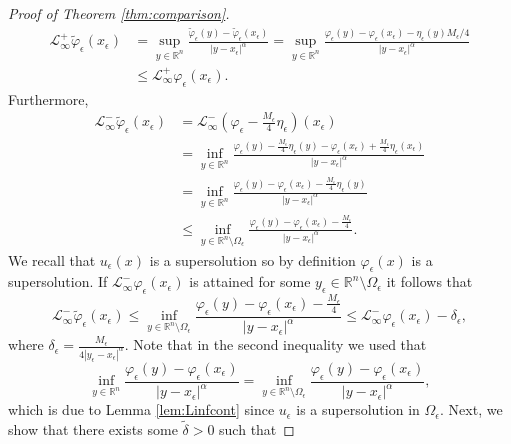 \documentclass[11pt]{article}
\providecommand{\Lpos}{\mathcal{L}_{\infty}^+}
\providecommand{\Lneg}{\mathcal{L}_{\infty}^-}
\providecommand{\Rn}{\mathbb{R}^n}
\numberwithin{equation}{section}
\theoremstyle{definition}
\begin{document}
\begin{proof}[Proof of Theorem \ref{thm:comparison}]
\begin{align}
    \Lpos \tilde{\varphi}_{\epsilon}(x_{\epsilon}) &= \sup_{y \in \Rn} \frac{\tilde{\varphi}_{\epsilon}(y)-\tilde{\varphi}_{\epsilon}(x_{\epsilon})}{|y-x_{\epsilon}|^{\alpha}} = \sup_{y \in \Rn} \frac{\varphi_{\epsilon}(y)-\varphi_{\epsilon}(x_{\epsilon})-\eta_{\epsilon} (y)M_{\epsilon}/4}{|y-x_{\epsilon}|^{\alpha}} \nonumber \\
    & \leq \Lpos \varphi_{\epsilon}(x_{\epsilon}). \label{eq:Lplus}
\end{align}
 Furthermore, 
\begin{align}
    \Lneg \tilde{\varphi}_{\epsilon}(x_{\epsilon}) &= \Lneg \left(\varphi_{\epsilon}-\frac{M_{\epsilon}}{4} \eta_{\epsilon} \right)(x_{\epsilon}) \nonumber \\  
    &= \inf_{y \in \Rn} \frac{\varphi_{\epsilon}(y)-\frac{M_{\epsilon}}{4}\eta_{\epsilon} (y)-\varphi_{\epsilon}(x_{\epsilon})+\frac{M_{\epsilon}}{4}\eta_{\epsilon} (x_{\epsilon})}{|y-x_{\epsilon}|^{\alpha}}\nonumber   \\
    &=\inf_{y \in \Rn} \frac{\varphi_{\epsilon}(y)-\varphi_{\epsilon}(x_{\epsilon})-\frac{M_{\epsilon}}{4}\eta_{\epsilon} (y)}{|y-x_{\epsilon}|^{\alpha}} \nonumber \\
    &\leq  \inf_{y \in \Rn \setminus \Omega_{\epsilon}} \frac{\varphi_{\epsilon}(y)-\varphi_{\epsilon}(x_{\epsilon})-\frac{M_{\epsilon}}{4}}{|y-x_{\epsilon}|^{\alpha}}. \nonumber  %
\end{align}
We recall that $u_{\epsilon}(x)$ is a supersolution so by definition $\varphi_{\epsilon}(x)$ is a supersolution. If $\Lneg \varphi_{\epsilon}(x_{\epsilon})$ is attained for some $y_{\epsilon} \in \Rn \setminus \Omega_{\epsilon}$ it follows that
\begin{equation}\label{eq:wantthis}
   \Lneg \tilde{\varphi}_{\epsilon}(x_{\epsilon}) \leq \inf_{y \in \Rn \setminus \Omega_{\epsilon}} \frac{\varphi_{\epsilon}(y)-\varphi_{\epsilon}(x_{\epsilon})-\frac{M_{\epsilon}}{4}}{|y-x_{\epsilon}|^{\alpha}} \leq  \Lneg \varphi_{\epsilon}(x_{\epsilon})-\delta_{\epsilon},
\end{equation}
where $\delta_{\epsilon} = \frac{M_{\epsilon}}{4|y_{\epsilon}-x_{\epsilon}|^{\alpha}}$. Note that in the second inequality we used that
$$
\inf_{y \in \Rn} \frac{\varphi_{\epsilon}(y)-\varphi_{\epsilon}(x_{\epsilon})}{|y-x_{\epsilon}|^{\alpha}} = \inf_{y \in \Rn \setminus \Omega_{\epsilon}} \frac{\varphi_{\epsilon}(y)-\varphi_{\epsilon}(x_{\epsilon})}{|y-x_{\epsilon}|^{\alpha}},
$$
which is due to Lemma \ref{lem:Linfcont} since $u_{\epsilon}$ is a supersolution in $\Omega_{\epsilon}$. Next, we show that there exists some $\tilde{\delta}>0$ such that

\end{proof}
\end{document}
